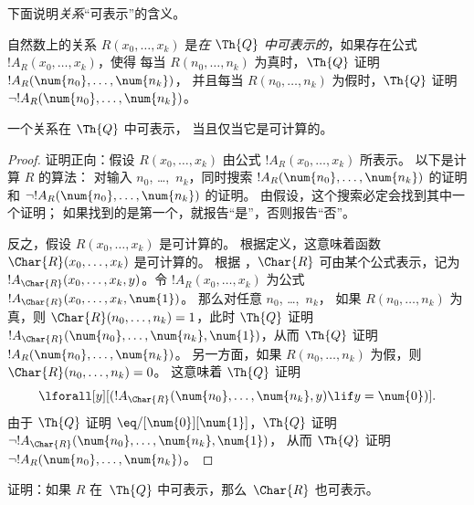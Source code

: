 \documentclass[../../../include/open-logic-section]{subfiles}
\begin{document}


下面说明\emph{关系}“可表示”的含义。

\begin{defn}
 自然数上的关系 $R(x_0,\dots,x_k)$
是{\em 在 $\Th{Q}$ 中可表示的}，如果存在公式 $!A_R(x_0,\dots,x_k)$，使得
每当 $R(n_0,\dots,n_k)$ 为真时，$\Th{Q}$ 证明 $!A_R(\num{n_0},\dots,\num{n_k})$，
并且每当 $R(n_0,\dots,n_k)$ 为假时，$\Th{Q}$ 证明 $\lnot !A_R(\num{n_0},
\dots, \num{n_k})$。
\end{defn}

\begin{thm}
 一个关系在 $\Th{Q}$ 中可表示，
当且仅当它是可计算的。
\end{thm}

\begin{proof}
证明正向：假设 $R(x_0,\dots,x_k)$ 由公式 $!A_R(x_0,\dots,x_k)$ 所表示。
以下是计算 $R$ 的算法：
对输入 $n_0$, \dots,~$n_k$，同时搜索 $!A_R(\num{n_0}, \dots, \num{n_k})$ 的证明和
$\lnot !A_R(\num{n_0}, \dots, \num{n_k})$ 的证明。
由假设，这个搜索必定会找到其中一个证明；
如果找到的是第一个，就报告“是”，否则报告“否”。

反之，假设 $R(x_0, \dots, x_k)$ 是可计算的。
根据定义，这意味着函数 $\Char{R}(x_0, \dots, x_k)$ 是可计算的。
根据 ，$\Char{R}$
可由某个公式表示，记为 $!A_{\Char{R}}(x_0, \dots, x_k,
y)$。令 $!A_R(x_0, \dots, x_k)$ 为公式 $!A_{\Char{R}}(x_0,
\dots, x_k, \num{1})$。
那么对任意 $n_0$, \dots,~$n_k$，
如果 $R(n_0,
\dots, n_k)$ 为真，则 $\Char{R}(n_0, \dots, n_k) = 1$，此时 $\Th{Q}$ 证明
$!A_{\Char{R}}(\num{n_0}, \dots, \num{n_k},
\num{1})$，从而 $\Th{Q}$ 证明 $!A_R(\num{n_0}, \dots,
\num{n_k})$。
另一方面，如果 $R(n_0, \dots, n_k)$ 为假，则 $\Char{R}(n_0, \dots, n_k) = 0$。
这意味着 $\Th{Q}$ 证明 \[
\lforall[y][(!A_{\Char{R}}(\num{n_0}, \dots, \num{n_k}, y) \lif y =
  \num{0})].
\]
由于 $\Th{Q}$ 证明 $\eq/[\num{0}][\num{1}]$，$\Th{Q}$ 证明 $\lnot !A_{\Char{R}}(\num{n_0}, \dots, \num{n_k}, \num{1})$，
从而 $\Th{Q}$ 证明 $\lnot !A_R(\num{n_0}, \dots, \num{n_k})$。
\end{proof}

\begin{prob}
证明：如果 $R$ 在~$\Th{Q}$ 中可表示，那么~$\Char{R}$ 也可表示。
\end{prob}
\end{document}
